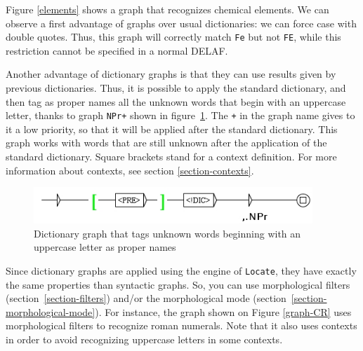 \bigskip
\noindent Figure \ref{elements} shows a graph that recognizes chemical
elements. We can observe a first advantage of graphs over usual dictionaries: we can force case
with double quotes. Thus, this graph will
correctly match \verb+Fe+ but not \verb+FE+, while this restriction cannot be specified in a
normal DELAF.

\bigskip
\noindent Another advantage of dictionary graphs is that they can use results
given by previous dictionaries. Thus, it is possible to apply the standard dictionary, and then tag as proper
names all the unknown words that begin with an uppercase letter, thanks to
graph \verb$NPr+$ shown in figure~\ref{graph-NPr}. The \verb$+$ in the graph
name gives to it a low priority, so that it will be applied after the standard
dictionary. This graph works with words that are still unknown after the
application of the standard dictionary. Square brackets stand for a context definition.
For more information about contexts, see section
\ref{section-contexts}.

\begin{figure}[!h]
\begin{center}
\includegraphics[width=10.5cm]{resources/img/fig3-13.png}
\caption{Dictionary graph that tags unknown words beginning with an uppercase letter as proper names\label{graph-NPr}}
\end{center}
\end{figure}

\noindent Since dictionary graphs are applied using the engine of \verb+Locate+,
they have exactly the same properties than syntactic graphs. So,
you can use morphological filters (section~\ref{section-filters})
and/or the morphological mode (section~\ref{section-morphological-mode}).
For instance, the
graph shown on Figure \ref{graph-CR} uses morphological filters to recognize
roman numerals. Note that it also uses contexts in order to avoid recognizing 
uppercase letters in some contexts.

